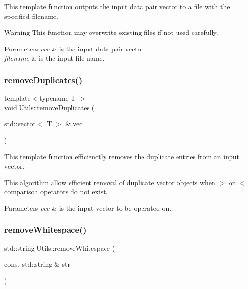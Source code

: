 This template function outputs the input data pair vector to a file with the specified filename. 

\begin{DoxyWarning}{Warning}
This function may overwrite existing files if not used carefully. 
\end{DoxyWarning}

\begin{DoxyParams}{Parameters}
{\em vec} & is the input data pair vector. \\
\hline
{\em filename} & is the input file name. \\
\hline
\end{DoxyParams}
\mbox{\label{namespace_utils_a5f64d00eec0b50ac5bd119652c99d01b}} 
\subsubsection{\texorpdfstring{remove\+Duplicates()}{removeDuplicates()}}
{\footnotesize\ttfamily template$<$typename T $>$ \\
void Utils\+::remove\+Duplicates (\begin{DoxyParamCaption}\item[{std\+::vector$<$ T $>$ \&}]{vec }\end{DoxyParamCaption})}



This template function efficienctly removes the duplicate entries from an input vector. 

This algorithm allow efficient removal of duplicate vector objects when $>$ or $<$ comparison operators do not exist. 
\begin{DoxyParams}{Parameters}
{\em vec} & is the input vector to be operated on. \\
\hline
\end{DoxyParams}
\mbox{\label{namespace_utils_af9ceee3373ffe317f07d177cf0dfe056}} 
\subsubsection{\texorpdfstring{remove\+Whitespace()}{removeWhitespace()}}
{\footnotesize\ttfamily std\+::string Utils\+::remove\+Whitespace (\begin{DoxyParamCaption}\item[{const std\+::string \&}]{str }\end{DoxyParamCaption})}



